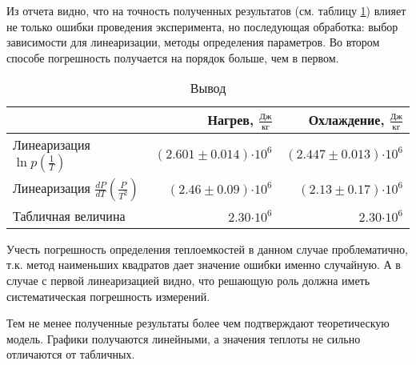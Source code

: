 \documentclass[12pt,a4paper]{article}
\newcommand{\e}[1]{\text{$\cdot10^{#1}$}}
\begin{document}
Из отчета видно, что на точность полученных результатов (см. таблицу \ref{tab:itog}) влияет не только ошибки проведения эксперимента, но последующая обработка: выбор зависимости для линеаризации, методы определения параметров. Во втором способе погрешность получается на порядок больше, чем в первом.


\begin{table}[H]
	\caption{Вывод}
	\label{tab:itog}
	\centering
	\footnotesize
	\begin{tabular}{l|r|r}
		\toprule
		$ $ & Нагрев, $\frac{\text{Дж}}{\text{кг}}$& Охлаждение, $\frac{\text{Дж}}{\text{кг}}$ \\ \midrule
		Линеаризация $\ln{p}(\frac{1}{T})$          & $(2.601 \pm 0.014)\e{6}$ & $(2.447 \pm 0.013)\e{6}$  \\ \midrule 
		Линеаризация $\frac{dP}{dT}(\frac{P}{T^2})$ & $(2.46 \pm 0.09)\e{6}$ & $(2.13 \pm 0.17)\e{6} $  \\ \midrule
		Табличная величина 							& $2.30\e{6} $ & $2.30\e{6} $  \\ 
		\bottomrule
	\end{tabular}
\end{table}

Учесть погрешность определения теплоемкостей в данном случае проблематично, т.к. метод наименьших квадратов дает значение ошибки именно случайную. А в случае с первой линеаризацией видно, что решающую роль должна иметь систематическая погрешность измерений.


Тем не менее полученные результаты более чем подтверждают теоретическую модель. Графики получаются линейными, а значения теплоты не сильно отличаются от табличных.
 
\end{document}
